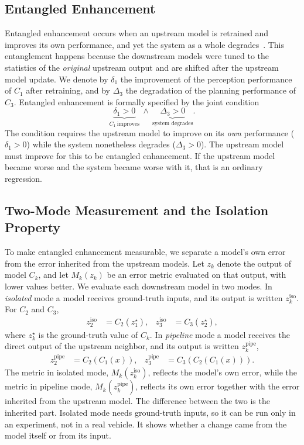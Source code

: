 \documentclass[conference]{IEEEtran}
\begin{document}
\subsection{Entangled Enhancement}
\label{sec:ee-def}
Entangled enhancement occurs when an upstream model is retrained and improves its own performance, and yet the system as a whole degrades~\cite{wang2024compsac}.
This entanglement happens because the downstream models were tuned to the
statistics of the \emph{original} upstream output and are shifted after the upstream model update. We denote by $\delta_1$ the improvement of the perception performance of
$C_1$ after retraining, and by $\Delta_3$ the
degradation of the planning performance of $C_3$. Entangled enhancement is formally specified by the joint condition
\begin{equation}
\underbrace{\delta_1 > 0}_{C_1\ \text{improves}}
\ \wedge\
\underbrace{\Delta_3 > 0}_{\text{system degrades}}.
\label{eq:ee}
\end{equation}
The condition requires the upstream model to improve on its \emph{own} performance
($\delta_1 > 0$) while the system nonetheless degrades ($\Delta_3 > 0$). The upstream model must improve for this to be entangled enhancement. If the upstream model became worse and the system became worse with it, that is an ordinary regression.

\subsection{Two-Mode Measurement and the Isolation Property}
\label{sec:dualmode}
To make entangled enhancement measurable, we separate a model's own error from
the error inherited from the upstream models. Let $z_k$ denote the output of model $C_k$,
and let $M_k(z_k)$ be an error metric evaluated on that output, with lower values
better. We evaluate each downstream model in two modes. In \emph{isolated} mode a
model receives ground-truth inputs, and its output is written $z_k^{\text{iso}}$.
For $C_2$ and $C_3$,
\begin{align}
z_2^{\text{iso}} &= C_2(z_1^{\star}), &
z_3^{\text{iso}} &= C_3(z_2^{\star}),
\label{eq:iso-mode}
\end{align}
where $z_k^{\star}$ is the ground-truth value of $C_k$. In \emph{pipeline}
mode a model receives the direct output of the upstream neighbor, and its output is
written $z_k^{\text{pipe}}$,
\begin{align}
z_2^{\text{pipe}} &= C_2(C_1(x)), &
z_3^{\text{pipe}} &= C_3(C_2(C_1(x))).
\label{eq:pipe-mode}
\end{align}
The metric in isolated mode, $M_k(z_k^{\text{iso}})$, reflects the model's own
error, while the metric in pipeline mode, $M_k(z_k^{\text{pipe}})$, reflects its
own error together with the error inherited from the upstream model. The
difference between the two is the inherited part. Isolated mode needs
ground-truth inputs, so it can be run only in an experiment, not in a real
vehicle. It shows whether a change came from the model itself or from its input.
\end{document}
